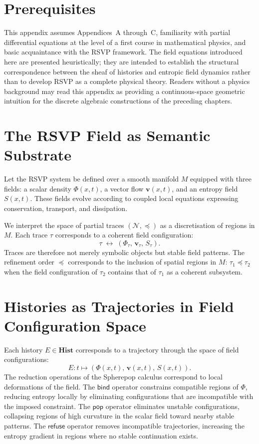 \documentclass[12pt, oneside]{amsbook}
\theoremstyle{plain}
\theoremstyle{definition}
\theoremstyle{remark}
\newcommand{\NF}{\mathcal{N}}
\newcommand{\bind}{\mathsf{bind}}
\newcommand{\pop}{\mathsf{pop}}
\newcommand{\refuse}{\mathsf{refuse}}
\newcommand{\RSVPfield}{\Phi}
\newcommand{\RSVPvec}{\mathbf{v}}
\begin{document}
\section{Prerequisites}

This appendix assumes Appendices~A through~C, familiarity with partial
differential equations at the level of a first course in mathematical
physics, and basic acquaintance with the RSVP framework. The field equations
introduced here are presented heuristically; they are intended to
establish the structural correspondence between the sheaf of histories and
entropic field dynamics rather than to develop RSVP as a complete physical
theory. Readers without a physics background may read this appendix as
providing a continuous-space geometric intuition for the discrete algebraic
constructions of the preceding chapters.

\section{The RSVP Field as Semantic Substrate}

Let the RSVP system be defined over a smooth manifold $M$ equipped with
three fields: a scalar density $\RSVPfield(x,t)$, a vector flow
$\RSVPvec(x,t)$, and an entropy field $S(x,t)$. These fields evolve
according to coupled local equations expressing conservation, transport, and
dissipation.

We interpret the space of partial traces $(\NF, \preceq)$ as a discretisation
of regions in $M$. Each trace $\tau$ corresponds to a coherent field
configuration:
\[
  \tau \;\longleftrightarrow\; (\RSVPfield_\tau,\, \RSVPvec_\tau,\, S_\tau).
\]
Traces are therefore not merely symbolic objects but stable field patterns.
The refinement order $\preceq$ corresponds to the inclusion of spatial
regions in $M$: $\tau_1 \preceq \tau_2$ when the field configuration of
$\tau_2$ contains that of $\tau_1$ as a coherent subsystem.

\section{Histories as Trajectories in Field Configuration Space}

Each history $E \in \mathbf{Hist}$ corresponds to a trajectory through the
space of field configurations:
\[
  E : t \mapsto (\RSVPfield(x,t),\, \RSVPvec(x,t),\, S(x,t)).
\]
The reduction operations of the Spherepop calculus correspond to local
deformations of the field. The $\bind$ operator constrains compatible regions
of $\RSVPfield$, reducing entropy locally by eliminating configurations that
are incompatible with the imposed constraint. The $\pop$ operator eliminates
unstable configurations, collapsing regions of high curvature in the scalar
field toward nearby stable patterns. The $\refuse$ operator removes
incompatible trajectories, increasing the entropy gradient in regions
where no stable continuation exists.
\end{document}
